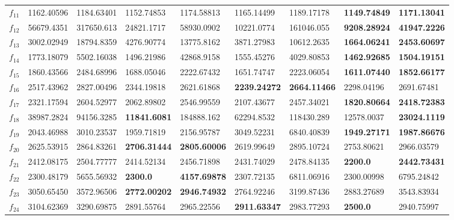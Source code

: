 \begin{table*}[t!]
\begin{tabular}{|p{0.8cm}|p{1.6cm}|p{1.6cm}|p{1.6cm}|p{1.6cm}|p{1.6cm}|p{1.6cm}|p{1.6cm}|p{1.6cm}|}
$f_{11}$  & 1162.40596 & 1184.63401 & 1152.74853 & 1174.58813 & 1165.14499 & 1189.17178 & \textbf{1149.74849} & \textbf{1171.13041} \\ 
$f_{12}$  & 56679.4351 & 317650.613 & 24821.1717 & 58930.0902 & 10221.0774 & 161046.055 & \textbf{9208.28924} & \textbf{41947.2226} \\ 
$f_{13}$  & 3002.02949 & 18794.8359 & 4276.90774 & 13775.8162 & 3871.27983 & 10612.2635 & \textbf{1664.06241} & \textbf{2453.60697} \\ 
$f_{14}$  & 1773.18079 & 5502.16038 & 1496.21986 & 42868.9158 & 1555.45276 & 4029.80853 & \textbf{1462.92685} & \textbf{1504.19151} \\ 
$f_{15}$  & 1860.43566 & 2484.68996 & 1688.05046 & 2222.67432 & 1651.74747 & 2223.06054 & \textbf{1611.07440} & \textbf{1852.66177} \\ 
$f_{16}$  & 2517.43962 & 2827.00496 & 2344.19818 & 2621.61868 & \textbf{2239.24272} & \textbf{2664.11466} & 2298.04196 & 2691.67481 \\ 
$f_{17}$  & 2321.17594 & 2604.52977 & 2062.89802 & 2546.99559 & 2107.43677 & 2457.34021 & \textbf{1820.80664} & \textbf{2418.72383} \\ 
$f_{18}$  & 38987.2824 & 94156.3285 & \textbf{11841.6081} & 184888.162 & 62294.8532 & 118430.289 & 12578.0037 & \textbf{23024.1119} \\ 
$f_{19}$  & 2043.46988 & 3010.23537 & 1959.71819 & 2156.95787 & 3049.52231 & 6840.40839 & \textbf{1949.27171} & \textbf{1987.86676} \\ 
$f_{20}$  & 2625.53915 & 2864.83261 & \textbf{2706.31444} & \textbf{2805.60006} & 2619.99649 & 2895.10724 & 2753.80621 & 2966.03579 \\ 
$f_{21}$  & 2412.08175 & 2504.77777 & 2414.52134 & 2456.71898 & 2431.74029 & 2478.84135 & \textbf{2200.0} & \textbf{2442.73431} \\ 
$f_{22}$  & 2300.48179 & 5655.56932 & \textbf{2300.0} & \textbf{4157.69878} & 2307.72135 & 6811.06916 & 2300.00998 & 6795.24842 \\ 
$f_{23}$  & 3050.65450 & 3572.96506 & \textbf{2772.00202} & \textbf{2946.74932} & 2764.92246 & 3199.87436 & 2883.27689 & 3543.83934 \\ 
$f_{24}$  & 3104.62369 & 3290.69875 & 2891.55764 & 2965.22556 & \textbf{2911.63347} & 2983.77293 & \textbf{2500.0} & 2940.75997 \\ 

\end{tabular}
\end{table*}
